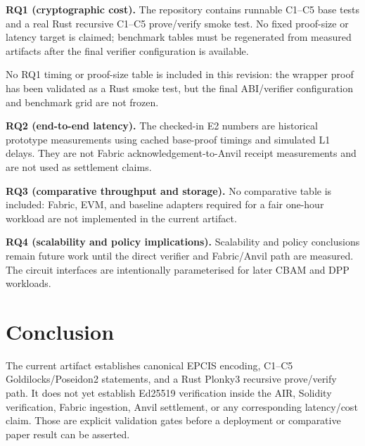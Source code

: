 \documentclass[journal]{IEEEtran}
\begin{document}
\textbf{RQ1 (cryptographic cost).} The repository contains runnable C1--C5 base tests and a real Rust recursive C1--C5 prove/verify smoke test. No fixed proof-size or latency target is claimed; benchmark tables must be regenerated from measured artifacts after the final verifier configuration is available.

No RQ1 timing or proof-size table is included in this revision: the wrapper proof has been validated as a Rust smoke test, but the final ABI/verifier configuration and benchmark grid are not frozen.

\textbf{RQ2 (end-to-end latency).} The checked-in E2 numbers are historical prototype measurements using cached base-proof timings and simulated L1 delays. They are not Fabric acknowledgement-to-Anvil receipt measurements and are not used as settlement claims.

\textbf{RQ3 (comparative throughput and storage).} No comparative table is included: Fabric, EVM, and baseline adapters required for a fair one-hour workload are not implemented in the current artifact.

\textbf{RQ4 (scalability and policy implications).} Scalability and policy conclusions remain future work until the direct verifier and Fabric/Anvil path are measured. The circuit interfaces are intentionally parameterised for later CBAM and DPP workloads.

\section{Conclusion}
\label{sec:conclusion}
The current artifact establishes canonical EPCIS encoding, C1--C5 Goldilocks/Poseidon2 statements, and a Rust Plonky3 recursive prove/verify path. It does not yet establish Ed25519 verification inside the AIR, Solidity verification, Fabric ingestion, Anvil settlement, or any corresponding latency/cost claim. Those are explicit validation gates before a deployment or comparative paper result can be asserted.
\end{document}
